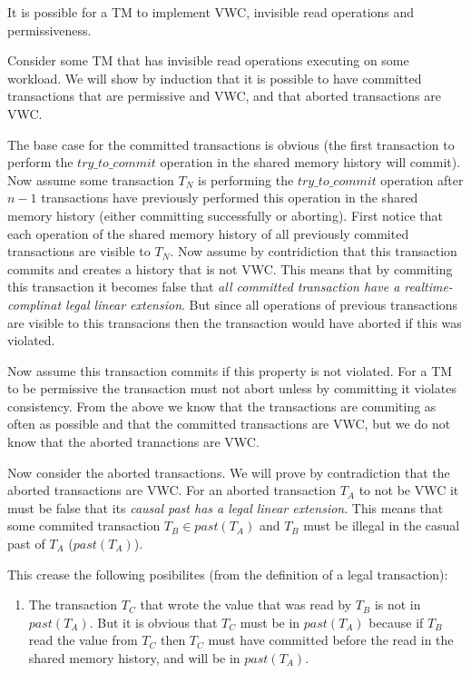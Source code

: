 \documentclass[11pt]{article}
\begin{document}
\begin{theorem}
\label{vwcinvisperm} 
It is possible for a TM to implement VWC, invisible read operations and permissiveness.
\end{theorem}
\vspace{-0.15cm}
\begin{proofT}

Consider some TM that has invisible read operations executing on some workload.
We will show by induction that it is possible to have committed transactions that are permissive and VWC, and that aborted transactions are VWC.

The base case for the committed transactions is obvious (the first transaction to perform the $try\_to\_commit$ operation in the shared memory history will commit).
Now assume some transaction $T_N$ is performing the $try\_to\_commit$ operation after $n-1$ transactions have previously performed this operation in the shared memory history (either committing successfully or aborting).
First notice that each operation of the shared memory history of all previously commited transactions are visible to $T_N$.
Now assume by contridiction that this transaction commits and creates a history that is not VWC.
This means that by commiting this transaction it becomes false that \emph{all committed transaction have a realtime-complinat legal linear extension}.
But since all operations of previous transactions are visible to this transacions then the transaction would have aborted if this was violated.

Now assume this transaction commits if this property is not violated.
For a TM to be permissive the transaction must not abort unless by committing it violates consistency.
From the above we know that the transactions are commiting as often as possible and that the committed transactions are VWC, but we do not know that the aborted tranactions are VWC.

Now consider the aborted transactions.
We will prove by contradiction that the aborted transactions are VWC.
For an aborted transaction $T_A$ to not be VWC it must be false that its \emph{causal past has a legal linear extension}.
This means that some commited transaction $T_B \in past(T_A)$ and $T_B$ must be illegal in the casual past of $T_A$ ($past(T_A)$).

This crease the following posibilites (from the definition of a legal transaction):
\begin{enumerate}

\item \label{poss1} The transaction $T_C$ that wrote the value that was read by $T_B$ is not in $past(T_A)$.
But it is obvious that $T_C$ must be in $past(T_A)$ because if $T_B$ read the value from $T_C$ then $T_C$ must have committed before the read in the shared memory history, and will be in $past(T_A)$.


\end{enumerate}
\end{proofT}
\end{document}
